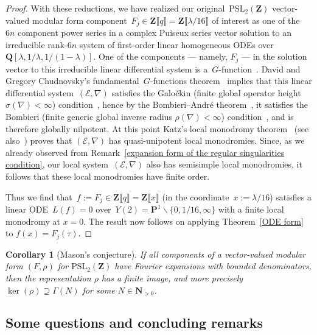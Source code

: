 \documentclass[10pt]{amsart}
\def\NwithoutzeroA{\mathbf{N}_{> 0}}
\def\PSL{\mathrm{PSL}}
\renewcommand\setminus{\smallsetminus}
\def\Z{\mathbf{Z}}
\def\Q{\mathbf{Q}}
\renewcommand\mathbb{\mathbf}
\newtheorem{cor}[subsubsection]{Corollary}
\theoremstyle{remark}
\numberwithin{equation}{subsection}
\begin{document}
\begin{proof}
 With these reductions, we have realized our original~$\PSL_2(\Z)$ vector-valued modular form component~$F_j \in \Z\llbracket q \rrbracket = \Z \llbracket \lambda/16 \rrbracket$ of interest as one of the~$6n$ component power series in a complex Puiseux series vector solution to an irreducible rank-$6n$ system of first-order linear homogeneous ODEs over $\Q[\lambda, 1/\lambda, 1/(1-\lambda)]$. One of the components --- namely, $F_j$ --- in the solution vector to this irreducible linear differential system is a~$G$-function~\cite[page~xiii]{DworkGerottoSullivan}. 
David and Gregory Chudnovsky's fundamental~$G$-functions theorem~\cite[Theorem~VIII.1.5]{DworkGerottoSullivan} implies that this linear differential system~$(\mathcal{E},\nabla)$ satisfies the Galo\v{c}kin (finite  global operator height $\sigma(\nabla) < \infty$) condition~\cite[VII.2.(2.3) on page~227]{DworkGerottoSullivan}, hence by the Bombieri--Andr\'e theorem~\cite[Theorem~VII.2.1]{DworkGerottoSullivan}, it satisfies the
Bombieri (finite generic global inverse radius $\rho(\nabla) < \infty$) condition~\cite[VII.2.(2.1) on page~226]{DworkGerottoSullivan}, and is therefore globally nilpotent.  At this point Katz's local monodromy
theorem~\cite{Katz} (see also~\cite[Theorem~III 2.3 (ii)]{DworkGerottoSullivan}) proves that $(\mathcal{E},\nabla)$ has 
quasi-unipotent local monodromies. Since, as we already observed from Remark~\ref{expansion form of the regular singularities condition}, our local system~$(\mathcal{E},\nabla)$ also has semisimple local monodromies, 
it follows that these local monodromies have finite order. 

Thus we find that~$f := F_j \in \Z\llbracket q \rrbracket = \Z \llbracket x \rrbracket$ (in the coordinate~$x := \lambda/16$) satisfies a linear ODE~$L(f) = 0$ over~$Y(2) = \mathbb{P}^1 \setminus \{0,1/16,\infty\}$ with a finite local monodromy at $x = 0$. The result now follows on 
applying Theorem~\ref{ODE form} to $f(x) = F_j(\tau)$. 
\end{proof}

\begin{cor}[Mason's conjecture] \label{Mason conjecture}
If all components of a vector-valued modular form $(F,\rho)$ for $\PSL_2(\Z)$ have  Fourier expansions with bounded denominators, then the representation $\rho$ has a finite image, and more precisely $\ker(\rho) \supseteq \Gamma(N)$ for some $N \in \NwithoutzeroA$.
\end{cor}


\subsection{Some questions and concluding remarks}  \label{questions and remarks}
\end{document}
